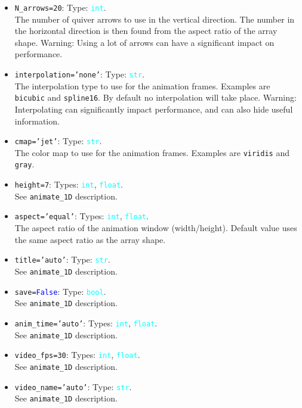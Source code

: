 \documentclass{article}
\newcommand{\ttt}[1]{\texttt{#1}}
\newcommand{\ptype}[1]{\texttt{\textcolor{cyan}{#1}}}
\newcommand{\cbl}[1]{\textcolor{blue}{#1}}
\newcommand{\cro}[1]{\textcolor{RedOrange}{#1}}
\newcommand{\cyo}[1]{\textcolor{YellowOrange}{#1}}
\begin{document}
\begin{itemize}
	\item \ttt{\cro{N\_arrows}=20}: Type: \ptype{int}.\\The number of quiver arrows to use in the vertical direction. The number in the horizontal direction is then found from the aspect ratio of the array shape. Warning: Using a lot of arrows can have a significant impact on performance.
	\item \ttt{\cro{interpolation}=\cyo{'none'}}: Type: \ptype{str}.\\The interpolation type to use for the animation frames. Examples are \ttt{bicubic} and \ttt{spline16}. By default no interpolation will take place. Warning: Interpolating can significantly impact performance, and can also hide useful information.
	\item \ttt{\cro{cmap}=\cyo{'jet'}}: Type: \ptype{str}.\\The color map to use for the animation frames. Examples are \ttt{viridis} and \ttt{gray}.
	\item \ttt{\cro{height}=7}: Types: \ptype{int}, \ptype{float}.\\See \ttt{animate\_1D} description.
	\item \ttt{\cro{aspect}=\cyo{'equal'}}: Types: \ptype{int}, \ptype{float}.\\The aspect ratio of the animation window (width/height). Default value uses the same aspect ratio as the array shape.
	\item \ttt{\cro{title}=\cyo{'auto'}}: Type: \ptype{str}.\\See \ttt{animate\_1D} description.
	\item \ttt{\cro{save}=\cbl{False}}: Type: \ptype{bool}.\\See \ttt{animate\_1D} description.
	\item \ttt{\cro{anim\_time}=\cyo{'auto'}}: Types: \ptype{int}, \ptype{float}.\\See \ttt{animate\_1D} description.
	\item \ttt{\cro{video\_fps}=30}: Types: \ptype{int}, \ptype{float}.\\See \ttt{animate\_1D} description.
	\item \ttt{\cro{video\_name}=\cyo{'auto'}}: Type: \ptype{str}.\\See \ttt{animate\_1D} description.
\end{itemize}
\end{document}
